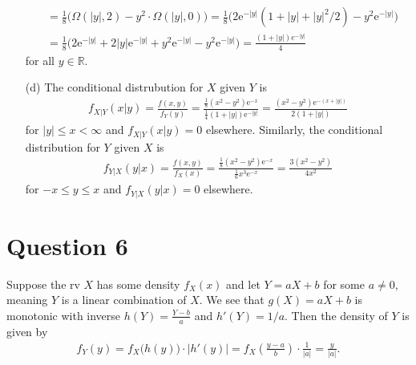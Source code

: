 \documentclass[10pt]{article}
\begin{document}
\begin{itemize}
\begin{align*}
        &= \frac{1}{8} \Big( \Omega(|y|,2) - y^2 \cdot \Omega(|y|,0) \Big)
        = \frac{1}{8} \Big( 2\mathrm{e}^{-|y|}(1 + |y| + |y|^2/2) - y^2\mathrm{e}^{-|y|} \Big) \\
        &= \frac{1}{8} \Big( 2\mathrm{e}^{-|y|} + 2|y|\mathrm{e}^{-|y|} + y^2\mathrm{e}^{-|y|} - y^2\mathrm{e}^{-|y|} \Big)
        = \frac{(1 + |y|) e^{-|y|}}{4}
    \end{align*}
    for all \(y \in \mathbb{R}\).
    \item[(d)] The conditional distrubution for \(X\) given \(Y\) is 
    \begin{align*}
        f_{X|Y}(x|y) = \frac{f(x,y)}{f_Y(y)}
        = \frac{\frac{1}{8}(x^2 - y^2)\mathrm{e}^{-x}}{\frac{1}{4}(1 + |y|)\mathrm{e}^{-|y|}}
        = \frac{(x^2 - y^2)\mathrm{e}^{-(x + |y|)}}{2(1+|y|)}
    \end{align*}
    for \(|y| \le x < \infty\) and \(f_{X|Y}(x|y) = 0\) elsewhere. 
    Similarly, the conditional distribution for \(Y\) given \(X\) is 
    \begin{align*}
        f_{Y|X}(y|x) = \frac{f(x,y)}{f_X(x)}
        = \frac{\frac{1}{8}(x^2 - y^2)\mathrm{e}^{-x}}{\frac{1}{6}x^3 \mathrm{e}^{-x}}
        = \frac{3(x^2 - y^2)}{4x^2}
    \end{align*}
    for \(-x \le y \le x\) and \(f_{Y|X}(y|x) = 0\) elsewhere. 
\end{itemize}

\section{Question 6} \noindent
Suppose the rv \(X\) has some density \(f_X(x)\) and let \(Y = aX + b\) for some \(a \neq 0\), meaning \(Y\) is a linear combination of \(X\). 
We see that \(g(X) = aX + b\) is monotonic with inverse \(h(Y) = \frac{Y - b}{a}\) and \(h'(Y) = 1/a\). Then the density of \(Y\) is given by 
\begin{align*}
    f_Y(y) = f_X \big( h(y) \big) \cdot \big| h'(y) \big|
    = f_X\left( \frac{y - a}{b} \right) \cdot \frac{1}{|a|} = \frac{y}{|a|}.
\end{align*}
\end{document}

